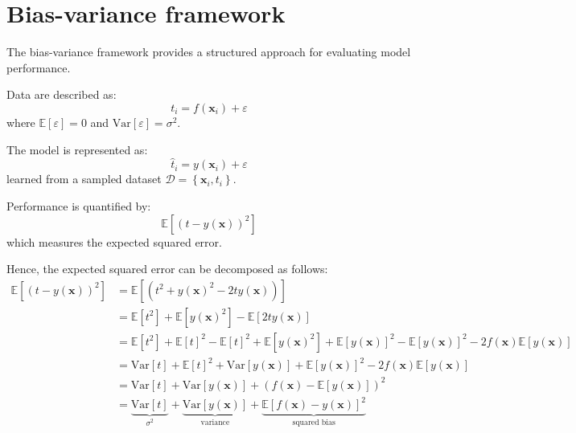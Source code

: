 \section{Bias-variance framework}

The bias-variance framework provides a structured approach for evaluating model performance.
\begin{definition}
    Data are described as:
    \[t_i=f(\textbf{x}_i)+\varepsilon\]
    where $\mathbb{E}\left[\varepsilon\right]=0$ and $\text{Var}\left[\varepsilon\right]=\sigma^2$. 
\end{definition}
\begin{definition}
    The model is represented as:
    \[\hat{t}_i=y(\textbf{x}_i)+\varepsilon\]
    learned from a sampled dataset $\mathcal{D}=\left\{ \textbf{x}_i,t_i \right\}$. 
\end{definition}
\begin{definition}
    Performance is quantified by:
    \[\mathbb{E}\left[ {\left( t-y(\textbf{x}) \right)}^2 \right]\]
    which measures the expected squared error.
\end{definition}
Hence, the expected squared error can be decomposed as follows:
\begin{align*}
    \mathbb{E}\left[ {\left( t-y(\textbf{x}) \right)}^2 \right]   &= \mathbb{E}\left[ \left( t^2+y{(\textbf{x})}^2-2ty(\textbf{x}) \right) \right] \\
                                                                &= \mathbb{E}\left[ t^2  \right]+ \mathbb{E}\left[y{(\textbf{x})}^2 \right]- \mathbb{E}\left[2ty(\textbf{x}) \right] \\
                                                                &= \mathbb{E}\left[ t^2  \right] + \mathbb{E}{\left[ t \right]}^2 - \mathbb{E}{\left[ t \right]}^2+ \mathbb{E}\left[y{(\textbf{x})}^2 \right] +  \mathbb{E}{\left[y(\textbf{x}) \right]}^2 - \mathbb{E}{\left[y(\textbf{x}) \right]}^2 -  2f(\textbf{x})\mathbb{E}\left[y(\textbf{x}) \right] \\
                                                                &= \text{Var}\left[ t  \right] + \mathbb{E}{\left[ t \right]}^2+ \text{Var}\left[y(\textbf{x}) \right] +  \mathbb{E}{\left[y(\textbf{x}) \right]}^2 -  2f(\textbf{x})\mathbb{E}\left[y(\textbf{x}) \right] \\
                                                                &= \text{Var}\left[ t  \right] +  \text{Var}\left[y(\textbf{x}) \right] +  {\left(f(\textbf{x}) -\mathbb{E}\left[y(\textbf{x}) \right]\right)}^2 \\
                                                                &= \underbrace{\text{Var}\left[ t  \right]}_{\sigma^2}  +  \underbrace{\text{Var}\left[y(\textbf{x}) \right]}_{\text{variance}}  +  \underbrace{\mathbb{E}{\left[f(\textbf{x}) -y(\textbf{x}) \right]}^2}_{\text{squared bias}} 
\end{align*}
